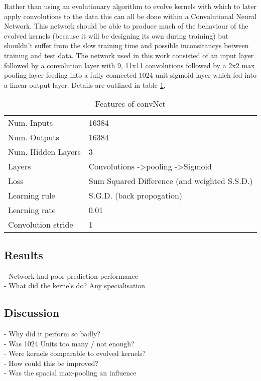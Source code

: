 Rather than using an evolutionary algorithm to evolve kernels with which to later apply convolutions to the data this can all be done within a Convolutional Neural Network. 
This network should be able to produce much of the behaviour of the evolved kernels (because it will be designing its own during training) but shouldn't suffer from the slow training time and possible inconsitancys between training and test data.
The network used in this work consisted of an input layer followed by a convolution layer with 9, 11x11 convolutions followed by a 2x2 max pooling layer feeding into a fully connected 1024 unit sigmoid layer which fed into a linear output layer. Details are outlined in table \ref{tb:convNetdef}.

\begin{table}[h]
\centering
\begin{tabular}{ | l | l | }
    \hline
    Num. Inputs & 16384 \\
    Num. Outputs & 16384 \\
    Num. Hidden Layers & 3 \\
    Layers & Convolutions -\textgreater pooling -\textgreater Sigmoid \\
    Loss & Sum Squared Difference (and weighted S.S.D.) \\
    Learning rule & S.G.D. (back propogation) \\
    Learning rate & 0.01 \\
    Convolution stride & 1 \\
    \hline
\end{tabular}
\caption{Features of convNet}
\label{tb:convNetdef}
\end{table}


\subsection{Results}
- Network had poor prediction performance
\\ - What did the kernels do? Any specialisation

\subsection{Discussion}
 - Why did it perform so badly?
\\ - Was 1024 Units too many / not enough?
\\ - Were kernels comparable to evolved kernels?
\\ - How could this be improved?
\\ - Was the spacial max-pooling an influence

